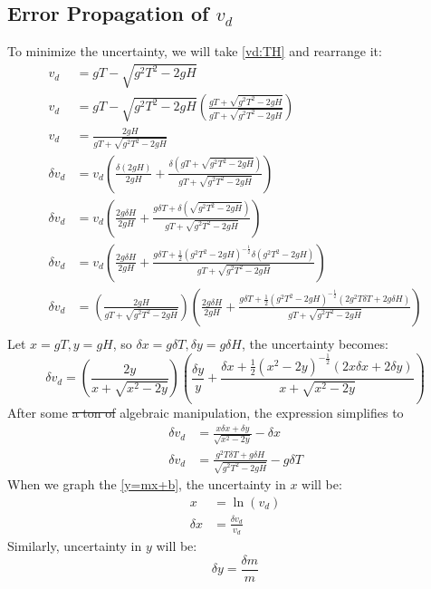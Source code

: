 \documentclass{article}
\begin{document}
\subsection{Error Propagation of $v_d$}
To minimize the uncertainty, we will take \eqref{vd:TH} and rearrange it:
\begin{align*}
    v_d&=gT-\sqrt{g^2T^2-2gH}\\
    v_d&=gT-\sqrt{g^2T^2-2gH}\left(\frac{gT+\sqrt{g^2T^2-2gH}}{gT+\sqrt{g^2T^2-2gH}}\right)\\
    v_d&=\frac{2gH}{gT+\sqrt{g^2T^2-2gH}}\label{vd}\tag{6}\\
    \delta v_d&=v_d\left(\frac{\delta\left(2gH\right)}{2gH}+\frac{\delta\left(gT+\sqrt{g^2T^2-2gH}\right)}{gT+\sqrt{g^2T^2-2gH}}\right)\\
    \delta v_d&=v_d\left(\frac{2g\delta H}{2gH}+\frac{g\delta T+\delta\left(\sqrt{g^2T^2-2gH}\right)}{gT+\sqrt{g^2T^2-2gH}}\right)\\
    \delta v_d&=v_d\left(\frac{2g\delta H}{2gH}+\frac{g\delta T+\frac 12\left(g^2T^2-2gH\right)^{-\frac 12}\delta\left(g^2T^2-2gH\right)}{gT+\sqrt{g^2T^2-2gH}}\right)\\
    \delta v_d&=\left(\frac{2gH}{gT+\sqrt{g^2T^2-2gH}}\right)\left(\frac{2g\delta H}{2gH}+\frac{g\delta T+\frac 12\left(g^2T^2-2gH\right)^{-\frac 12}\left(2g^2T\delta T+2g\delta H\right)}{gT+\sqrt{g^2T^2-2gH}}\right)\\
\end{align*}
Let $x=gT, y=gH$, so $\delta x=g\delta T, \delta y=g\delta H$, the uncertainty becomes:
\[
    \delta v_d=\left(\frac{2y}{x+\sqrt{x^2-2y}}\right)\left(\frac{\delta y}{y}+\frac{\delta x+\frac 12\left(x^2-2y\right)^{-\frac 12}\left(2x\delta x+2\delta y\right)}{x+\sqrt{x^2-2y}}\right)
\]
After some \st{a ton of} algebraic manipulation, the expression simplifies to 
\begin{align*}
\delta v_d&=\frac{x\delta x+\delta y}{\sqrt{x^2-2y}}-\delta x\\
\delta v_d&=\frac{g^2T\delta T+g\delta H}{\sqrt{g^2T^2-2gH}}-g\delta T\label{vd uncertainty}\tag{7}
\end{align*}
When we graph the \eqref{y=mx+b}, the uncertainty in $x$ will be:
\begin{align*}
    x&=\ln\left(v_d\right)\\
    \delta x&=\frac{\delta v_d}{v_d}\label{delta x}\tag{8}
\end{align*}
Similarly, uncertainty in $y$ will be:
\[\delta y=\frac{\delta m}{m}\label{delta y}\tag{9}\]
\end{document}
